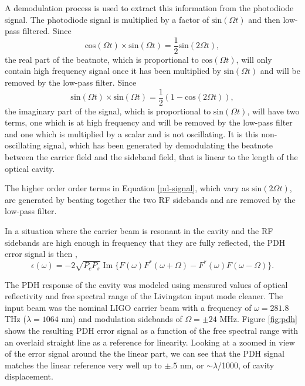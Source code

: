 A demodulation process is used to extract this information from the photodiode signal. The 
photodiode signal is multiplied by a factor of $\mathrm{sin}(\Omega t)$ and then low-pass 
filtered. Since 
\begin{equation}
\mathrm{cos}(\Omega t)\times\mathrm{sin}(\Omega t) = \frac{1}{2}\mathrm{sin}(2\Omega t),
\end{equation}
the real part of the beatnote, which is proportional to $\mathrm{cos}(\Omega t)$, 
will only contain high frequency signal once it has been multiplied by $\mathrm{sin}(\Omega t)$ 
and will be removed by the low-pass filter. 
Since
\begin{equation}
\mathrm{sin}(\Omega t)\times\mathrm{sin}(\Omega t) = \frac{1}{2}(1 - \mathrm{cos}(2\Omega t)),
\end{equation}
the imaginary part of the signal, which is proportional to $\mathrm{sin}(\Omega t)$, will 
have two terms, one which is at high frequency and will be removed by the low-pass filter 
and one which is multiplied by a scalar and is not oscillating. It is this 
non-oscillating signal, which has been generated by demodulating the beatnote between the 
carrier field and the sideband field, that is linear to the length of the optical cavity.

The higher order order terms in Equation \ref{pd-signal}, which vary as $\mathrm{sin}(2\Omega t)$,
are generated by beating together the two RF sidebands and are removed by the low-pass filter.

In a situation where the carrier beam is resonant in the cavity and the RF 
sidebands are high enough in frequency that they are fully reflected, the PDH error 
signal is then \cite{Black01},
\begin{equation}
\epsilon(\omega) = -2\sqrt{P_{c}P_{s}}\operatorname{Im}\{F(\omega)F^*(\omega + \Omega) - F^*(\omega)F(\omega - \Omega)\}.
\end{equation}

The PDH response of the cavity was modeled using measured values of optical 
reflectivity and free spectral range of the Livingston input mode cleaner. 
The input beam was the nominal LIGO carrier beam with a frequency of 
$\omega = 281.8$ THz ($\lambda = 1064$ nm) and modulation sidebands of 
$\Omega = \pm24$ MHz.
Figure \ref{fig:pdh} shows the resulting PDH error signal as a function of 
the free spectral range with an overlaid straight line as a reference for 
linearity. Looking at a zoomed in view of the error signal around the the linear 
part, we can see that the PDH signal matches the linear reference very well 
up to $\pm.5$ nm, or $\sim\lambda$/1000, of cavity displacement. 

